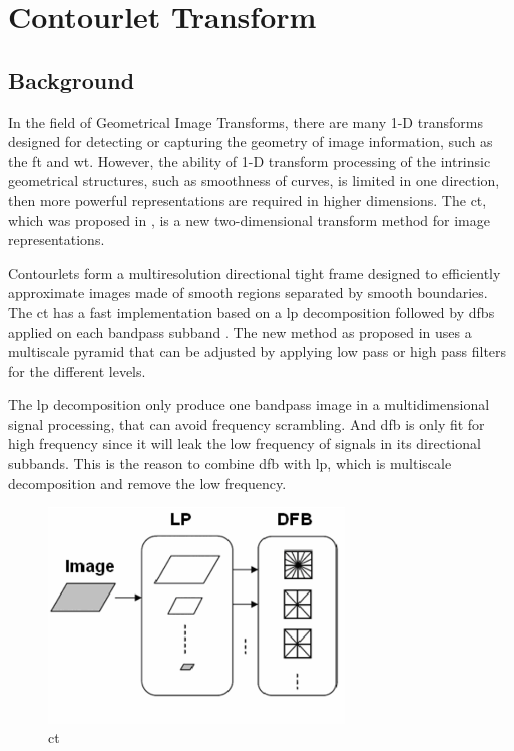 \section{Contourlet Transform}

\subsection{Background}
In the field of Geometrical Image Transforms, there are many 1-D transforms designed for detecting or capturing the geometry of image information, such as the \gls{ft} and \gls{wt}. However, the ability of 1-D transform processing of the intrinsic geometrical structures, such as smoothness of curves, is limited in one direction, then more powerful representations are required in higher dimensions. The \gls{ct}, which was proposed in \cite{do2005contourlet}, is a new two-dimensional transform method for image representations.

Contourlets form a multiresolution directional tight frame designed to efficiently approximate images made of smooth regions separated by smooth boundaries. The \gls{ct} has a fast implementation based on a \gls{lp} decomposition followed by \glspl{dfb} applied on each bandpass subband \cite{suresh2014artificial}. The new method as proposed in \cite{lu2006new} uses a multiscale pyramid that can be adjusted by applying low pass or high pass filters for the different levels.

The \gls{lp} decomposition only produce one bandpass image in a multidimensional signal processing, that can avoid frequency scrambling. And \gls{dfb} is only fit for high frequency since it will leak the low frequency of signals in its directional subbands. This is the reason to combine \gls{dfb} with \gls{lp}, which is multiscale decomposition and remove the low frequency.

\begin{figure}[H]
	\centering
	\includegraphics[width=0.7\textwidth]{fig/contourlet}
	\caption{\glsdesc{ct}}
	\label{fig:contourlet}
\end{figure}


